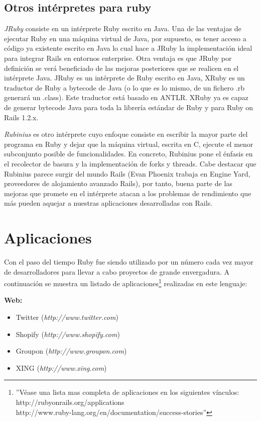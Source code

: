 \documentclass{article}
\begin{document}
\subsection{Otros intérpretes para ruby}

	\textit{JRuby} consiste en un intérprete Ruby escrito en Java. Una de las ventajas de ejecutar Ruby en una máquina virtual de Java, por supuesto, es tener acceso a código ya existente escrito en Java lo cual hace a JRuby la implementación ideal para integrar Rails en entornos enterprise. Otra ventaja es que JRuby por definición se verá beneficiado de las mejoras posteriores que se realicen en el intérprete Java. JRuby es un intérprete de Ruby escrito en Java, XRuby es un traductor de Ruby a bytecode de Java (o lo que es lo mismo, de un fichero .rb generará un .class). Este traductor está basado en ANTLR. XRuby ya es capaz de generar bytecode Java para toda la librería estándar de Ruby y para Ruby on Rails 1.2.x.
	\par
	\textit{Rubinius} es otro intérprete cuyo enfoque consiste en escribir la mayor parte del programa en Ruby y dejar que la máquina virtual, escrita en C, ejecute el menor subconjunto posible de funcionalidades. En concreto, Rubinius pone el énfasis en el recolector de basura y la implementación de forks y threads. Cabe destacar que Rubinius parece surgir del mundo Rails (Evan Phoenix trabaja en Engine Yard, proveedores de alojamiento avanzado Rails), por tanto, buena parte de las mejoras que promete en el intérprete atacan a los problemas de rendimiento que más pueden aquejar a nuestras aplicaciones desarrolladas con Rails.
\bigskip




\section{Aplicaciones}

	Con el paso del tiempo Ruby fue siendo utilizado por un número cada vez mayor de desarrolladores para llevar a cabo proyectos de grande envergadura. A continuación se muestra un listado de aplicaciones\footnote{''Véase una lista mas completa de aplicaciones en los siguientes vínculos: http://rubyonrails.org/applications\\http://www.ruby-lang.org/en/documentation/success-stories''} realizadas en este lenguaje:
\bigskip\bigskip

\textbf{Web:}
\begin{itemize}
	\itemsep=1pt \topsep=0pt \partopsep=0pt \parskip=0pt \parsep=0pt
	\item Twitter (\textit{http://www.twitter.com})
	\item Shopify (\textit{http://www.shopify.com})
	\item Groupon (\textit{http://www.groupon.com})
	\item XING (\textit{http://www.xing.com})
\end{itemize}
\medskip
\end{document}
